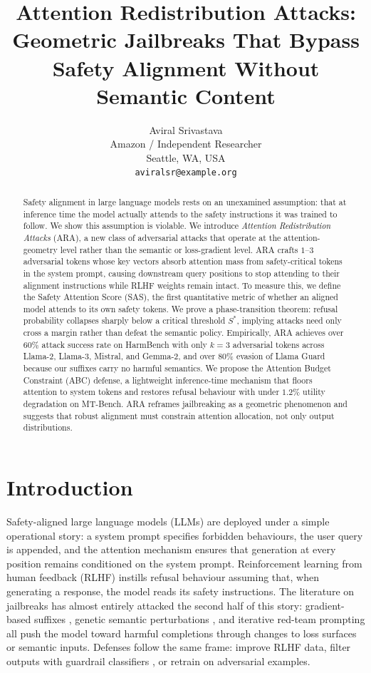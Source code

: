 \documentclass{article}
\title{Attention Redistribution Attacks: Geometric Jailbreaks That Bypass Safety Alignment Without Semantic Content}
\author{%
  Aviral Srivastava \\
  Amazon / Independent Researcher \\
  Seattle, WA, USA \\
  \texttt{aviralsr@example.org}
}
\theoremstyle{definition}
\theoremstyle{remark}
\begin{document}
\maketitle

\begin{abstract}
Safety alignment in large language models rests on an unexamined assumption: that at inference time the model actually attends to the safety instructions it was trained to follow. We show this assumption is violable. We introduce \emph{Attention Redistribution Attacks} (ARA), a new class of adversarial attacks that operate at the attention-geometry level rather than the semantic or loss-gradient level. ARA crafts $1$--$3$ adversarial tokens whose key vectors absorb attention mass from safety-critical tokens in the system prompt, causing downstream query positions to stop attending to their alignment instructions while RLHF weights remain intact. To measure this, we define the Safety Attention Score (SAS), the first quantitative metric of whether an aligned model attends to its own safety tokens. We prove a phase-transition theorem: refusal probability collapses sharply below a critical threshold $S^*$, implying attacks need only cross a margin rather than defeat the semantic policy. Empirically, ARA achieves over $60\%$ attack success rate on HarmBench with only $k=3$ adversarial tokens across Llama-2, Llama-3, Mistral, and Gemma-2, and over $80\%$ evasion of Llama Guard because our suffixes carry no harmful semantics. We propose the Attention Budget Constraint (ABC) defense, a lightweight inference-time mechanism that floors attention to system tokens and restores refusal behaviour with under $1.2\%$ utility degradation on MT-Bench. ARA reframes jailbreaking as a geometric phenomenon and suggests that robust alignment must constrain attention allocation, not only output distributions.
\end{abstract}

\section{Introduction}
\label{sec:intro}

Safety-aligned large language models (LLMs) are deployed under a simple operational story: a system prompt specifies forbidden behaviours, the user query is appended, and the attention mechanism ensures that generation at every position remains conditioned on the system prompt. Reinforcement learning from human feedback (RLHF) \cite{ouyang2022training} instills refusal behaviour assuming that, when generating a response, the model reads its safety instructions. The literature on jailbreaks has almost entirely attacked the second half of this story: gradient-based suffixes \cite{zou2023universal}, genetic semantic perturbations \cite{liu2023autodan}, and iterative red-team prompting \cite{chao2023pair} all push the model toward harmful completions through changes to loss surfaces or semantic inputs. Defenses follow the same frame: improve RLHF data, filter outputs with guardrail classifiers \cite{inan2023llamaguard}, or retrain on adversarial examples.
\end{document}
